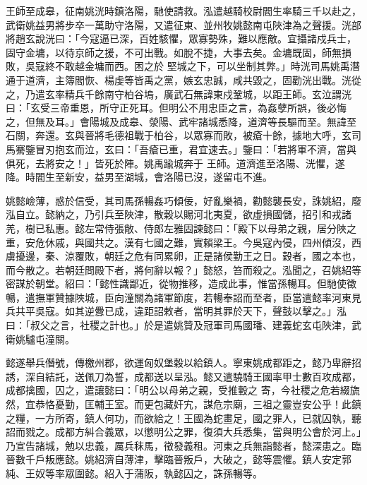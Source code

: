 \begin{pinyinscope}
 王師至成皋，征南姚洸時鎮洛陽，馳使請救。泓遣越騎校尉閻生率騎三千以赴之，武衛姚益男將步卒一萬助守洛陽，又遣征東、並州牧姚懿南屯陜津為之聲援。洸部將趙玄說洸曰：「今寇逼已深，百姓駭懼，眾寡勢殊，難以應敵。宜攝諸戍兵士，固守金墉，以待京師之援，不可出戰。如脫不捷，大事去矣。金墉既固，師無損敗，吳寇終不敢越金墉而西。困之於
 堅城之下，可以坐制其弊。」時洸司馬姚禹潛通于道濟，主簿閻恢、楊虔等皆禹之黨，嫉玄忠誠，咸共毀之，固勸洸出戰。洸從之，乃遣玄率精兵千餘南守柏谷塢，廣武石無諱東戍鞏城，以距王師。玄泣謂洸曰：「玄受三帝重恩，所守正死耳。但明公不用忠臣之言，為姦孽所誤，後必悔之，但無及耳。」會陽城及成皋、滎陽、武牢諸城悉降，道濟等長驅而至。無諱至石關，奔還。玄與晉將毛德祖戰于柏谷，以眾寡而敗，被瘡十餘，據地大呼，玄司馬騫鑒冒刃抱玄而泣，玄曰：「吾瘡已重，君宜速去。」鑒曰：「若將軍不濟，當與俱死，去將安之！」皆死於陣。姚禹踰城奔于
 王師。道濟進至洛陽、洸懼，遂降。時閻生至新安，益男至湖城，會洛陽已沒，遂留屯不進。



 姚懿嶮薄，惑於信受，其司馬孫暢姦巧傾佞，好亂樂禍，勸懿襲長安，誅姚紹，廢泓自立。懿納之，乃引兵至陜津，散穀以賜河北夷夏，欲虛損國儲，招引和戎諸羌，樹已私惠。懿左常侍張敞、侍郎左雅固諫懿曰：「殿下以母弟之親，居分陜之重，安危休戚，與國共之。漢有七國之難，實賴梁王。今吳寇內侵，四州傾沒，西虜擾邊，秦、涼覆敗，朝廷之危有同累卵，正是諸侯勤王之日。穀者，國之本也，而今散之。若朝廷問殿下者，將何辭以報？」懿怒，笞而殺之。泓聞之，召姚紹等
 密謀於朝堂。紹曰：「懿性識鄙近，從物推移，造成此事，惟當孫暢耳。但馳使徵暢，遣撫軍贊據陜城，臣向潼關為諸軍節度，若暢奉詔而至者，臣當遣懿率河東見兵共平吳寇。如其逆釁已成，違距詔敕者，當明其罪於天下，聲鼓以擊之。」泓曰：「叔父之言，社稷之計也。」於是遣姚贊及冠軍司馬國璠、建義蛇玄屯陜津，武衛姚驢屯潼關。



 懿遂舉兵僭號，傳檄州郡，欲運匈奴堡穀以給鎮人。寧東姚成都距之，懿乃卑辭招誘，深自結託，送佩刀為誓，成都送以呈泓。懿又遣驍騎王國率甲士數百攻成都，成都擒國，囚之，遣讓懿曰：「明公以母弟之親，受推轂之
 寄，今社稷之危若綴旒然，宜恭恪憂勤，匡輔王室。而更包藏奸宄，謀危宗廟，三祖之靈豈安公乎！此鎮之糧，一方所寄，鎮人何功，而欲給之！王國為蛇畫足，國之罪人，已就囚執，聽詔而戮之。成都方糾合義眾，以懲明公之罪，復須大兵悉集，當與明公會於河上。」乃宣告諸城，勉以忠義，厲兵秣馬，徵發義租。河東之兵無詣懿者，懿深患之。臨晉數千戶叛應懿。姚紹濟自薄津，擊臨晉叛戶，大破之，懿等震懼。鎮人安定郭純、王奴等率眾圍懿。紹入于蒲阪，執懿囚之，誅孫暢等。




\end{pinyinscope}
